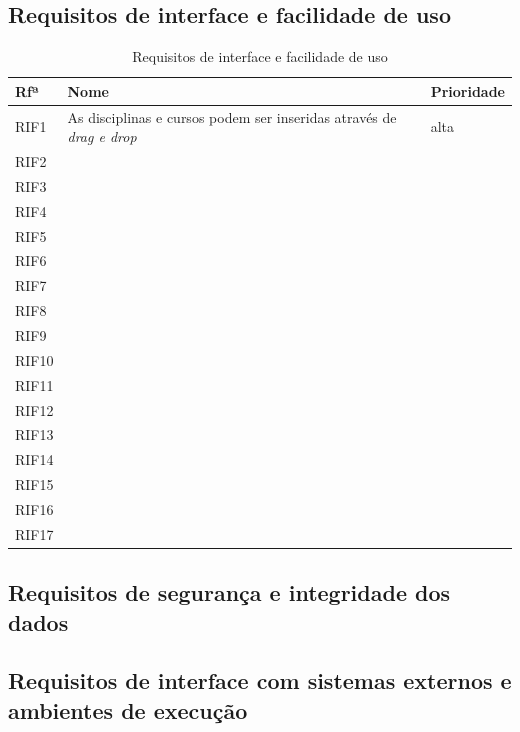 \documentclass[11pt, twoside]{report}
\begin{document}
	\subsection{Requisitos de interface e facilidade de uso}
	\begin{table}[H]
		\centering
		\caption{Requisitos de interface e facilidade de uso}	
		\vspace{0.5cm}
		\begin{tabular}{|l|l|l|}
			\hline
			Rfª & Nome & Prioridade\\
			\hline
			RIF1 & As disciplinas e cursos podem ser inseridas através de \textit{drag e drop} &alta\\
			\hline
			RIF2 & &\\
			\hline
			RIF3 &&\\
			\hline
			RIF4 &&\\
			\hline
			RIF5 &&\\
			\hline
			RIF6&&\\
			\hline
			RIF7& & \\
			\hline
			RIF8& & \\
			\hline
			RIF9& &\\
			\hline
			RIF10&&\\
			\hline
			RIF11&&\\
			\hline
			RIF12& &\\
			\hline
			RIF13&&\\
			\hline
			RIF14&&\\
			\hline
			RIF15&&\\
			\hline
			RIF16&&\\
			\hline
			RIF17&&\\
			\hline
		\end{tabular}
		\label{requisitosdeinterface}
	\end{table}
	\subsection{Requisitos de segurança e integridade dos dados}
	\subsection{Requisitos de interface com sistemas externos e ambientes de execução}
	
\end{document}

